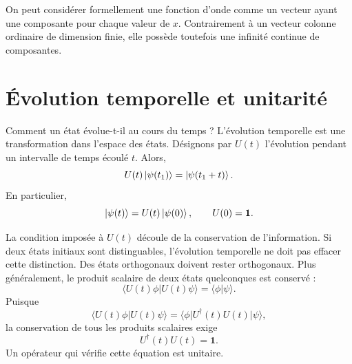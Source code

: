On peut considérer formellement une fonction d’onde comme un vecteur ayant une composante pour chaque valeur de \(x\). Contrairement à un vecteur colonne ordinaire de dimension finie, elle possède toutefois une infinité continue de composantes.

\begin{classroomqa}
\end{classroomqa}

\section{Évolution temporelle et unitarité}

Comment un état évolue-t-il au cours du temps ? L’évolution temporelle est une transformation dans l’espace des états. Désignons par \(U(t)\) l’évolution pendant un intervalle de temps écoulé \(t\). Alors,
\begin{equation}
U(t)\left\lvert\psi(t_1)\right\rangle=\left\lvert\psi(t_1+t)\right\rangle.
\end{equation}
En particulier,
\begin{equation}
\left\lvert\psi(t)\right\rangle=U(t)\left\lvert\psi(0)\right\rangle,
\qquad
U(0)=\mathbf 1.
\end{equation}

La condition imposée à \(U(t)\) découle de la conservation de l’information. Si deux états initiaux sont distinguables, l’évolution temporelle ne doit pas effacer cette distinction. Des états orthogonaux doivent rester orthogonaux. Plus généralement, le produit scalaire de deux états quelconques est conservé :
\begin{equation}
\langle U(t)\phi|U(t)\psi\rangle
=\langle\phi|\psi\rangle.
\end{equation}
Puisque
\begin{equation}
\langle U(t)\phi|U(t)\psi\rangle
=\langle\phi|U^\dagger(t)U(t)|\psi\rangle,
\end{equation}
la conservation de tous les produits scalaires exige
\begin{equation}
U^\dagger(t)U(t)=\mathbf 1.
\end{equation}
Un opérateur qui vérifie cette équation est unitaire.

